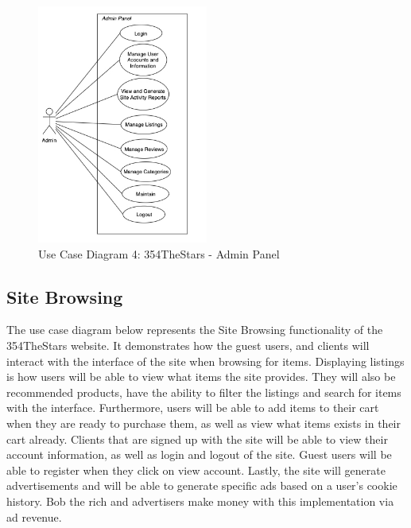 \documentclass[11pt]{article}
\newcounter{use case ID}
\begin{document}
\begin{figure}[htbp]
    \centering
    \includegraphics[width=0.5\textwidth]{Diagrams/Use_Case/ucdadmin.png}
    \caption{Use Case Diagram 4: 354TheStars - Admin Panel }
    \label{fig:ucd4}
\end{figure}

\clearpage
\subsection{Site Browsing}

The use case diagram below represents the Site Browsing functionality of the 354TheStars website. It demonstrates how the guest users, and clients will interact with the interface of the site when browsing for items. Displaying listings is how users will be able to view what items the site provides. They will also be recommended products, have the ability to filter the listings and search for items with the interface. Furthermore, users will be able to add items to their cart when they are ready to purchase them, as well as view what items exists in their cart already. Clients that are signed up with the site will be able to view their account information, as well as login and logout of the site. Guest users will be able to register when they click on view account. Lastly, the site will generate advertisements and will be able to generate specific ads based on a user's cookie history. Bob the rich and advertisers make money with this implementation via ad revenue.
\end{document}
